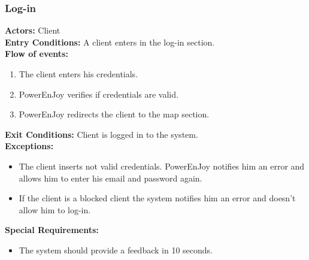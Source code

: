 \subsubsection{Log-in}
%
\textbf{Actors:}
Client\\
%
\textbf{Entry Conditions:}
A client enters in the log-in section.\\
%
\textbf{Flow of events:}
\begin{enumerate}
\item The client enters his credentials.
\item PowerEnJoy verifies if credentials are valid.
\item PowerEnJoy redirects the client to the map section.
\end{enumerate}
%
\textbf{Exit Conditions:}
Client is logged in to the system.\\
%
\textbf{Exceptions:}
\begin{itemize}
\item The client inserts not valid credentials. PowerEnJoy notifies him an error and allows him to enter his email and password again.
\item If the client is a blocked client the system notifies him an error and doesn't allow him to log-in.
\end{itemize}
%
\textbf{Special Requirements:}
\begin{itemize}
\item The system should provide a feedback in 10 seconds.
\end{itemize}


